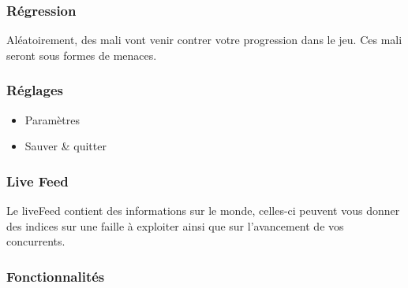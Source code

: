 \subsubsection{Régression}

Aléatoirement, des mali vont venir contrer votre progression dans le jeu. Ces mali seront sous formes de menaces. 

\subsubsection{Réglages}
\begin{itemize}
            \item Paramètres
            \item Sauver \& quitter
\end{itemize}
\subsubsection{Live Feed}
Le liveFeed contient des informations sur le monde, celles-ci peuvent vous donner des indices sur une faille à exploiter ainsi que sur l'avancement de vos concurrents.

\subsubsection{Fonctionnalités}

